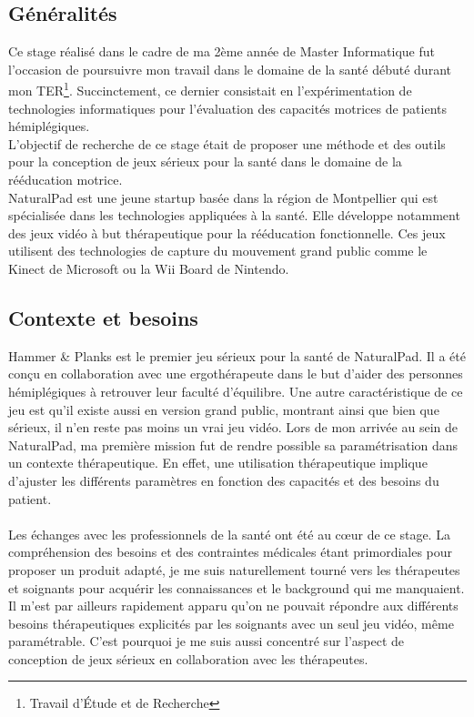 \documentclass[french, 12pt]{article} %
\begin{document}
	\subsection{Généralités}
Ce stage réalisé dans le cadre de ma 2ème année de Master Informatique fut l'occasion de poursuivre mon travail dans le domaine de la santé débuté durant mon TER\footnote{Travail d'Étude et de Recherche}. Succinctement, ce dernier consistait en l'expérimentation de technologies informatiques pour l'évaluation des capacités motrices de patients hémiplégiques. \\
L'objectif de recherche de ce stage était de proposer une méthode et des outils pour la conception de jeux sérieux pour la santé dans le domaine de la rééducation motrice. \\
NaturalPad est une jeune startup basée dans la région de Montpellier qui est spécialisée dans les technologies appliquées à la santé. Elle développe notamment des jeux vidéo à but thérapeutique pour la rééducation fonctionnelle. Ces jeux utilisent des technologies de capture du mouvement grand public comme le Kinect de Microsoft ou la Wii Board de Nintendo. \\

	\subsection{Contexte et besoins}
Hammer \& Planks est le premier jeu sérieux pour la santé de NaturalPad. Il a été conçu en collaboration avec une ergothérapeute dans le but d'aider des personnes hémiplégiques à retrouver leur faculté d'équilibre. Une autre caractéristique de ce jeu est qu'il existe aussi en version grand public, montrant ainsi que bien que sérieux, il n'en reste pas moins un vrai jeu vidéo. Lors de mon arrivée au sein de NaturalPad, ma première mission fut de rendre possible sa paramétrisation dans un contexte thérapeutique. En effet, une utilisation thérapeutique implique d'ajuster les différents paramètres en fonction des capacités et des besoins du patient.\paragraph{}
Les échanges avec les professionnels de la santé ont été au cœur de ce stage. La compréhension des besoins et des contraintes médicales étant primordiales pour proposer un produit adapté, je me suis naturellement tourné vers les thérapeutes et soignants pour acquérir les connaissances et le background qui me manquaient. Il m'est par ailleurs rapidement apparu qu'on ne pouvait répondre aux différents besoins thérapeutiques explicités par les soignants avec un seul jeu vidéo, même paramétrable. C'est pourquoi je me suis aussi concentré sur l'aspect de conception de jeux sérieux en collaboration avec les thérapeutes. 
\end{document}
